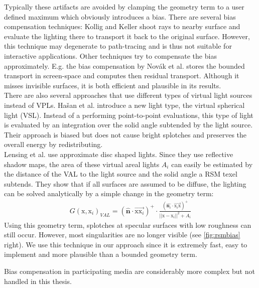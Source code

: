 \documentclass[thesis.tex]{subfiles}
\begin{document}
Typically these artifacts are avoided by clamping the geometry term to a user defined maximum which obviously introduces a bias.
There are several bias compensation techniques:
Kollig and Keller \cite{bib:biascomp:kk04} shoot rays to nearby surface and evaluate the lighting there to transport it back to the original surface.
However, this technique may degenerate to path-tracing and is thus not suitable for interactive applications.
Other techniques try to compensate the bias approximately.
E.g. the bias compensation by Nov\'{a}k et al. \cite{bib:biascomp:novak11} stores the bounded transport in screen-space and computes then residual transport. 
Although it misses invisible surfaces, it is both efficient and plausible in its results.
\\
There are also several approaches that use different types of virtual light sources instead of VPLs.
Ha{\v{s}}an et al. \cite{bib:biascomp:vsl} introduce a new light type, the virtual spherical light (VSL).
Instead of a performing point-to-point evaluations, this type of light is evaluated by an integration over the solid angle subtended by the light source.
Their approach is biased but does not cause bright splotches and preserves the overall energy by redistributing.
\\
Lensing et al. \cite{bib:LightskinPaper} use approximate disc shaped lights.
Since they use reflective shadow maps, the area of these virtual areal lights $A_{i}$ can easily be estimated by the distance of the VAL to the light source and the solid angle a RSM texel subtends.
They show that if all surfaces are assumed to be diffuse, the lighting can be solved analytically by a simple change in the geometry term:
\begin{align}
G(\mathrm{x}, \mathrm{x}_i)_{VAL} = (\hat{\mathbf{n}} \cdot \overrightarrow{\mathrm{x}\mathrm{x}_i})^+ \cdot \frac{(\hat{\mathbf{n}_i} \cdot \overrightarrow{\mathrm{x}_i\mathrm{x}} )^+}{||\mathrm{x} - \mathrm{x}_i||^2 + A_{i}}
\end{align}
Using this geometry term, splotches at specular surfaces with low roughness can still occur.
However, most singularities are no longer visible (see \autoref{fig:rsmbias} right).
We use this technique in our approach since it is extremely fast, easy to implement and more plausible than a bounded geometry term.

Bias compensation in participating media are considerably more complex but not handled in this thesis.
\end{document}
